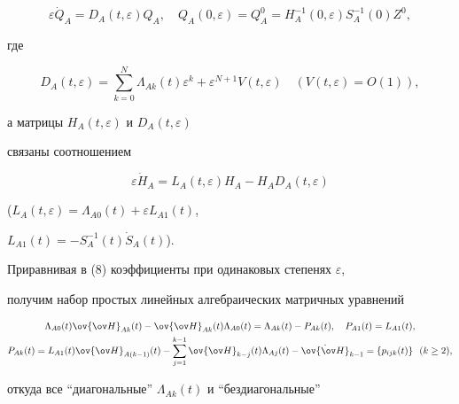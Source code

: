 \begin{pf}
\begin{equation} 


\varepsilon\Dot Q_A=D_A(t,\varepsilon)Q_A,\quad 


Q_A(0,\varepsilon)=Q^0_A=H^{-1}_A(0,\varepsilon)S^{-1}_A(0)Z^0, 


\end{equation} 


где 


$$ 


D_A(t,\varepsilon)=\sum^N_{k=0}\Lambda_{Ak}(t)\varepsilon^k+ 


\varepsilon^{N+1}V(t,\varepsilon)\quad 


(V(t,\varepsilon)=O(1)), 


$$ 


а матрицы $H_A(t,\varepsilon)$ и $D_A(t,\varepsilon)$ 


связаны соотношением 


\begin{equation} 


\varepsilon\Dot H_A=L_A(t,\varepsilon)H_A-H_A 


D_A(t,\varepsilon) 


\end{equation} 


($L_A(t,\varepsilon)=\Lambda_{A0}(t)+\varepsilon L_{A1}(t)$, 


$L_{A1}(t)=-S^{-1}_A(t)\Dot S_A(t)$). 


 


Приравнивая в (8) коэффициенты при одинаковых степенях $\varepsilon$, 


получим набор простых линейных алгебраических матричных уравнений 


\begin{gather*} 


\Lambda_{A0}(t)\ov{\ov H}_{Ak}(t)-\ov{\ov H}_{Ak}(t) 


\Lambda_{A0}(t)=\Lambda_{Ak}(t)-P_{Ak}(t),\quad 


P_{A1}(t)=L_{A1}(t),\\ 


P_{Ak}(t)=L_{A1}(t)\ov{\ov H}_{A(k-1)}(t)-\sum^{k-1}_{j=1} 


\ov{\ov H}_{k-j}(t)\Lambda_{Aj}(t)- 


\Dot{\ov{\ov H}}_{k-1}=\{p_{ijk}(t)\}\ \ (k\ge2), 


\end{gather*} 


откуда все ``диагональные'' $\Lambda_{Ak}(t)$ и ``бездиагональные'' 



\end{pf}
